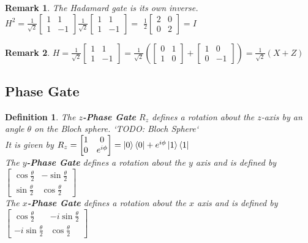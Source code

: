 \documentclass[12pt,twoside,fleqn]{report}
\theoremstyle{thmstyle}
\newtheorem{defn}{Definition}[chapter]
\newtheorem{remark}{Remark}[chapter]
\begin{document}
\begin{remark}
    The Hadamard gate is its own inverse.\\
    $H^2 = \frac{1}{\sqrt{2}} \begin{bmatrix} 1 & 1 \\ 1 & -1 \end{bmatrix} \frac{1}{\sqrt{2}} \begin{bmatrix} 1 & 1 \\ 1 & -1 \end{bmatrix} = $
    $\frac{1}{2} \begin{bmatrix}2 & 0 \\ 0 & 2 \end{bmatrix} = I$
\end{remark}
\begin{remark}
    $H =   \frac{1}{\sqrt{2}} \begin{bmatrix} 1 & 1 \\ 1 & -1 \end{bmatrix} = \frac{1}{\sqrt{2}} \left( \begin{bmatrix} 0 & 1 \\ 1 & 0 \end{bmatrix}  + \begin{bmatrix} 1 & 0 \\ 0 & -1 \end{bmatrix} \right) = \frac{1}{\sqrt{2}} (X + Z)$
\end{remark}

\subsection{Phase Gate}
\begin{defn}
    The \textbf{$z$-Phase Gate} $R_z$ defines a rotation about the $z$-axis by an angle $\theta$ on the Bloch sphere. `TODO: Bloch Sphere`\\
    It is given by $R_z= \begin{bmatrix} 1 & 0 \\ 0 & e^{i\phi} \end{bmatrix} = \ket{0}\bra{0} + e^{i\phi} \ket{1}\bra{1}$ \\

    The \textbf{$y$-Phase Gate} defines a rotation about the $y$ axis and is defined by \\
    $\begin{bmatrix} \cos \frac{\theta}{2} & - \sin \frac{\theta}{2} \\ \sin \frac{\theta}{2} & \cos \frac{\theta}{2} \end{bmatrix}$ \\
    The \textbf{$x$-Phase Gate} defines a rotation about the $x$ axis and is defined by \\
    $\begin{bmatrix} \cos \frac{\theta}{2} & - i \sin \frac{\theta}{2} \\ - i \sin \frac{\theta}{2} & \cos \frac{\theta}{2} \end{bmatrix}$
\end{defn}
\end{document}
